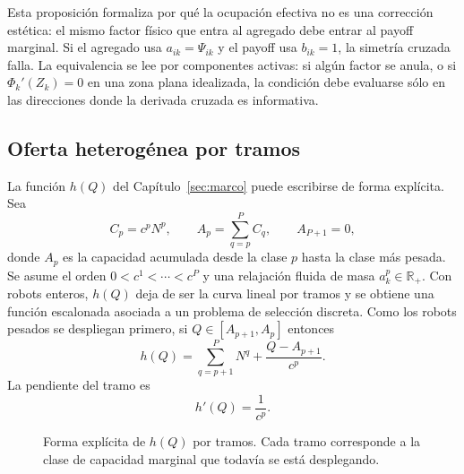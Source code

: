 \begin{observacion}
Esta proposición formaliza por qué la ocupación efectiva no es una corrección estética:
el mismo factor físico que entra al agregado debe entrar al payoff marginal. Si el
agregado usa $a_{ik}=\Psi_{ik}$ y el payoff usa $b_{ik}=1$, la simetría cruzada falla.
La equivalencia se lee por componentes activas: si algún factor se anula, o si
$\Phi_k'(Z_k)=0$ en una zona plana idealizada, la condición debe evaluarse sólo en las
direcciones donde la derivada cruzada es informativa.
\end{observacion}

\subsection{Oferta heterogénea por tramos}
\label{subsec:oferta-tramos}

La función $h(Q)$ del Capítulo~\ref{sec:marco} puede escribirse de forma explícita. Sea
\[
  C_p=c^pN^p,
  \qquad
  A_p=\sum_{q=p}^{P}C_q,
  \qquad
  A_{P+1}=0,
\]
donde $A_p$ es la capacidad acumulada desde la clase $p$ hasta la clase más pesada.
Se asume el orden $0<c^1<\cdots<c^P$ y una relajación fluida de masa
$a_k^p\in\mathbb{R}_+$. Con robots enteros, $h(Q)$ deja de ser la curva lineal por
tramos y se obtiene una función escalonada asociada a un problema de selección discreta.
Como los robots pesados se despliegan primero, si $Q\in[A_{p+1},A_p]$ entonces
\begin{equation}
  h(Q)=
  \sum_{q=p+1}^{P}N^q
  +
  \frac{Q-A_{p+1}}{c^p}.
  \label{eq:anexo_h_por_tramos}
\end{equation}
La pendiente del tramo es
\begin{equation}
  h'(Q)=\frac{1}{c^p}.
  \label{eq:anexo_pendiente_h}
\end{equation}

\begin{figure}[H]
\centering
{}
\caption{Forma explícita de $h(Q)$ por tramos. Cada tramo corresponde a la clase de
capacidad marginal que todavía se está desplegando.}
\label{fig:anexo_h_tramos}
\end{figure}

